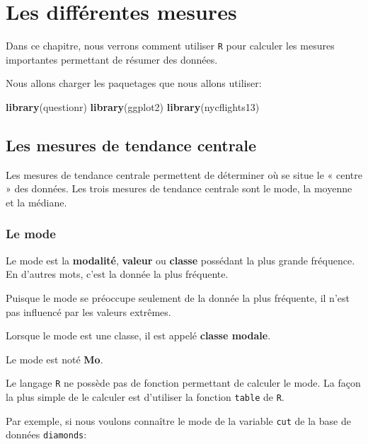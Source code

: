 \documentclass[]{book}
\newenvironment{Shaded}{\begin{snugshade}}{\end{snugshade}}
\newcommand{\KeywordTok}[1]{\textcolor[rgb]{0.13,0.29,0.53}{\textbf{#1}}}
\newcommand{\NormalTok}[1]{#1}
\theoremstyle{definition}
\theoremstyle{definition}
\theoremstyle{definition}
\theoremstyle{remark}
\begin{document}
\hypertarget{mesures}{%
\chapter{Les différentes mesures}\label{mesures}}

Dans ce chapitre, nous verrons comment utiliser \texttt{R} pour calculer
les mesures importantes permettant de résumer des données.

Nous allons charger les paquetages que nous allons utiliser:

\begin{Shaded}
\begin{Highlighting}[]
\KeywordTok{library}\NormalTok{(questionr)}
\KeywordTok{library}\NormalTok{(ggplot2)}
\KeywordTok{library}\NormalTok{(nycflights13)}
\end{Highlighting}
\end{Shaded}

\hypertarget{les-mesures-de-tendance-centrale}{%
\section{Les mesures de tendance
centrale}\label{les-mesures-de-tendance-centrale}}

Les mesures de tendance centrale permettent de déterminer où se situe le
« centre » des données. Les trois mesures de tendance centrale sont le
mode, la moyenne et la médiane.

\hypertarget{le-mode}{%
\subsection{Le mode}\label{le-mode}}

Le mode est la \textbf{modalité}, \textbf{valeur} ou \textbf{classe}
possédant la plus grande fréquence. En d'autres mots, c'est la donnée la
plus fréquente.

Puisque le mode se préoccupe seulement de la donnée la plus fréquente,
il n'est pas influencé par les valeurs extrêmes.

Lorsque le mode est une classe, il est appelé \textbf{classe modale}.

Le mode est noté \textbf{Mo}.

Le langage \texttt{R} ne possède pas de fonction permettant de calculer
le mode. La façon la plus simple de le calculer est d'utiliser la
fonction \texttt{table} de \texttt{R}.

Par exemple, si nous voulons connaître le mode de la variable
\texttt{cut} de la base de données \texttt{diamonds}:
\end{document}
